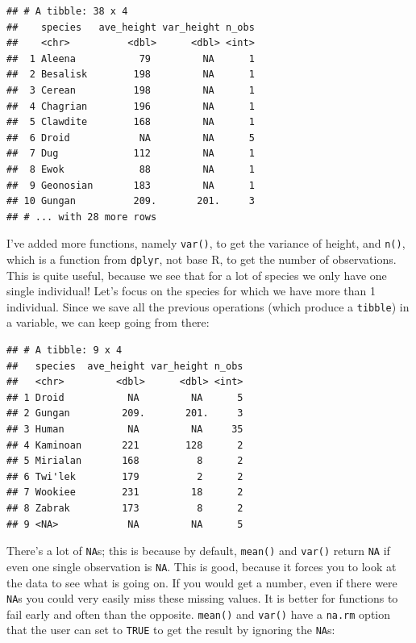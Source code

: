 \documentclass[]{gitbook}
\newenvironment{Shaded}{\begin{snugshade}}{\end{snugshade}}
\newcommand{\DecValTok}[1]{\textcolor[rgb]{0.00,0.00,0.81}{#1}}
\newcommand{\KeywordTok}[1]{\textcolor[rgb]{0.13,0.29,0.53}{\textbf{#1}}}
\newcommand{\NormalTok}[1]{#1}
\newcommand{\OperatorTok}[1]{\textcolor[rgb]{0.81,0.36,0.00}{\textbf{#1}}}
\newcommand{\StringTok}[1]{\textcolor[rgb]{0.31,0.60,0.02}{#1}}
\theoremstyle{definition}
\theoremstyle{definition}
\theoremstyle{definition}
\theoremstyle{remark}
\begin{document}
\begin{verbatim}
## # A tibble: 38 x 4
##    species   ave_height var_height n_obs
##    <chr>          <dbl>      <dbl> <int>
##  1 Aleena           79         NA      1
##  2 Besalisk        198         NA      1
##  3 Cerean          198         NA      1
##  4 Chagrian        196         NA      1
##  5 Clawdite        168         NA      1
##  6 Droid            NA         NA      5
##  7 Dug             112         NA      1
##  8 Ewok             88         NA      1
##  9 Geonosian       183         NA      1
## 10 Gungan          209.       201.     3
## # ... with 28 more rows
\end{verbatim}

I've added more functions, namely \texttt{var()}, to get the variance of
height, and \texttt{n()}, which is a function from \texttt{dplyr}, not
base R, to get the number of observations. This is quite useful, because
we see that for a lot of species we only have one single individual!
Let's focus on the species for which we have more than 1 individual.
Since we save all the previous operations (which produce a
\texttt{tibble}) in a variable, we can keep going from there:

\begin{Shaded}
\end{Shaded}

\begin{verbatim}
## # A tibble: 9 x 4
##   species  ave_height var_height n_obs
##   <chr>         <dbl>      <dbl> <int>
## 1 Droid           NA         NA      5
## 2 Gungan         209.       201.     3
## 3 Human           NA         NA     35
## 4 Kaminoan       221        128      2
## 5 Mirialan       168          8      2
## 6 Twi'lek        179          2      2
## 7 Wookiee        231         18      2
## 8 Zabrak         173          8      2
## 9 <NA>            NA         NA      5
\end{verbatim}

There's a lot of \texttt{NA}s; this is because by default,
\texttt{mean()} and \texttt{var()} return \texttt{NA} if even one single
observation is \texttt{NA}. This is good, because it forces you to look
at the data to see what is going on. If you would get a number, even if
there were \texttt{NA}s you could very easily miss these missing values.
It is better for functions to fail early and often than the opposite.
\texttt{mean()} and \texttt{var()} have a \texttt{na.rm} option that the
user can set to \texttt{TRUE} to get the result by ignoring the
\texttt{NA}s:
\end{document}
